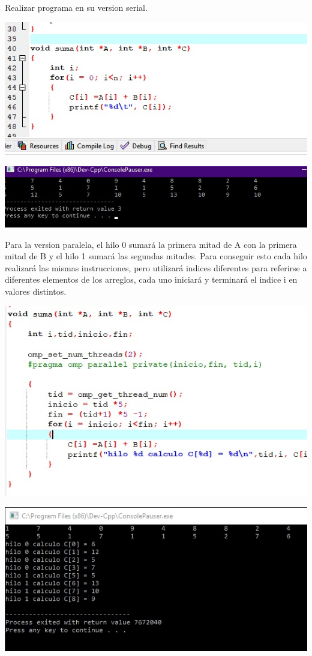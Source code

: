 \documentclass[12pt,letterpaper]{article}
\begin{document}
Realizar programa en su version serial.

\includegraphics[scale=.8]{ejercicio6.jpg}


\includegraphics[scale=1]{ejercicio61.jpg}

Para la version paralela, el hilo 0 sumará la primera mitad de A con la primera mitad de B y el hilo 1 sumará las segundas mitades. Para conseguir esto cada hilo realizará las mismas instrucciones, pero utilizará indices diferentes para referirse a diferentes elementos de los arreglos, cada uno iniciará y terminará el indice i en valores distintos.

\includegraphics[scale=.8]{ejercicio62.jpg}


\includegraphics[scale=1]{ejercicio63.jpg}
\end{document}
